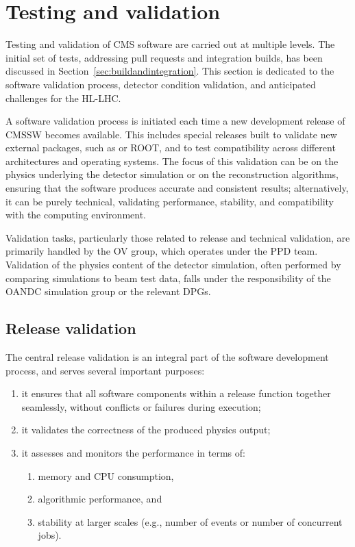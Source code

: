 \clearpage

%
%
% 
\section{Testing and validation}
\label{sec:Validation}


Testing and validation of CMS software are carried out at multiple levels. The initial set of tests, addressing pull requests and integration builds, has been discussed in Section~\ref{sec:buildandintegration}. This section is dedicated to the software validation process, detector condition validation, and anticipated challenges for the \gls{HL-LHC}.

A software validation process is initiated each time a new development release of \gls{CMSSW} becomes available. This includes special releases built to validate new external packages, such as \GEANTfour or \textsc{ROOT}, and to test compatibility across different architectures and operating systems. The focus of this validation can be on the physics underlying the detector simulation or on the reconstruction algorithms, ensuring that the software produces accurate and consistent results; alternatively, it can be purely technical, validating performance, stability, and compatibility with the computing environment.

Validation tasks, particularly those related to release and technical validation, are primarily handled by the \gls{OV} group, which operates under the \gls{PPD} team. Validation of the physics content of the detector simulation, often performed by comparing simulations to beam test data, falls under the responsibility of the \gls{OANDC} simulation group or the relevant \glspl{DPG}. 

\subsection{Release validation}
The central release validation is an integral part of the software development process, and serves several important purposes:
\begin{enumerate}
    \item it ensures that all software components within a release function together seamlessly, without conflicts or failures during execution;
    \item it validates the correctness of the produced physics output;
    \item it assesses and monitors the performance in terms of:
    \begin{enumerate}
        \item memory and \gls{CPU} consumption,
        \item algorithmic performance, and
        \item stability at larger scales (e.g., number of events or number of concurrent jobs).
    \end{enumerate}
\end{enumerate}

